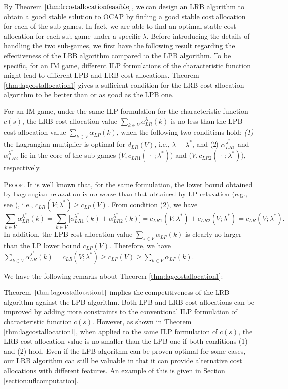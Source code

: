\documentclass[ijoc,nonblindrev]{informs3} %
\begin{document}
By Theorem $\ref{thm:lrcostallocationfeasible}$, we can design an LRB algorithm to obtain a good stable solution to OCAP by finding a good stable cost allocation for each of the sub-games. In fact, we are able to  find an optimal stable cost allocation for each sub-game under a specific $\lambda$.
Before introducing the details of handling the two sub-games, we first have the following result regarding the effectiveness of the LRB algorithm compared to the LPB algorithm. To be specific, for an IM game, different ILP formulations of the characteristic function might lead to different LPB and LRB cost allocations. Theorem \ref{thm:lagcostallocation1} gives a sufficient condition for the LRB cost allocation algorithm to be better than or as good as the LPB one.

\begin{theorem}\label{thm:lagcostallocation1}
For an IM game, under the same ILP formulation for the characteristic function $c(s)$, the LRB cost allocation value $\sum_{k \in V}\alpha_{LR}^{\lambda}(k)$ is no less than the LPB cost allocation value $\sum_{k \in V}\alpha_{LP}(k)$, when the following two conditions hold: {\em (1)} the Lagrangian multiplier is optimal for $d_{LR}(V)$, i.e., $\lambda = \lambda^*$, and  {\rm  (2)} $\alpha_{LR1}^{\lambda^*}$  and $\alpha_{LR2}^{\lambda^*}$  lie in the core of the sub-games $\big(V,c_{LR1}(\ \cdot\ ;\lambda^*)\big)$ and $\big(V,c_{LR2}(\ \cdot\ ;\lambda^*)\big)$, respectively.
\end{theorem}
{\scshape Proof.}
It is well known that, for the same formulation, the lower bound obtained by Lagrangian relaxation is no worse than that obtained by LP relaxation (e.g., see \citealt{Ahuja1993NetworkBook}), i.e., $c_{LR}(V;\lambda^*) \geq c_{LP}(V)$. From condition (2), we have $$\sum_{k \in V} \alpha_{LR}^{\lambda^*}(k) = \sum_{k \in V} \big[\alpha_{LR1}^{\lambda^*}(k) + \alpha_{LR2}^{\lambda^*}(k)\big] = c_{LR1}(V;\lambda^*) + c_{LR2}(V;\lambda^*) = c_{LR}(V;\lambda^*).$$
In addition, the LPB cost allocation value $\sum_{k \in V}\alpha_{LP}(k)$ is clearly no larger than the LP lower bound $c_{LP}(V)$. Therefore, we have $\sum_{k \in V} \alpha_{LR}^{\lambda^*}(k) = c_{LR}(V;\lambda^*) \geq c_{LP}(V) \geq \sum_{k \in V}\alpha_{LP}(k)$.
\hfill\Halmos





We have the following remarks about Theorem \ref{thm:lagcostallocation1}:
\begin{remark}
Theorem~$\ref{thm:lagcostallocation1}$ implies the competitiveness of the LRB algorithm against the LPB algorithm. Both LPB and LRB cost allocations can be improved by adding more constraints to the conventional ILP formulation of characteristic function $c(s)$. However, as shown in Theorem \ref{thm:lagcostallocation1}, when applied to the same ILP formulation of $c(s)$, the LRB cost allocation value is no smaller than the LPB one if both conditions (1) and (2) hold. Even if the LPB algorithm can be proven optimal for some cases, our LRB algorithm can still be valuable in that it can provide alternative cost allocations with different features. An example of this is given in Section \ref{section:uflcomputation}.
\end{remark}
\end{document}
